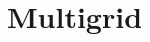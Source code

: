 \documentclass[12pt,MSc,twoside]{muthesis}
\begin{document}
\iffalse 
	 
\fi


% 

% 

% 

\chapter{Multigrid}




\end{document}
